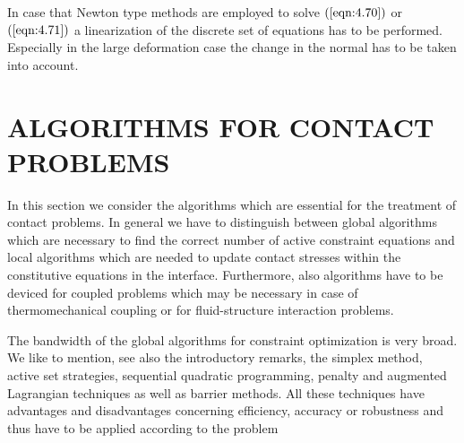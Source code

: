 In case that Newton type methods are employed to solve $ (\ref{eqn:4.70}) $ or $ (\ref{eqn:4.71}) $ a linearization of the discrete set of equations has to be performed. Especially in the large deformation case the change in the normal has to be taken into account. 
\section{ ALGORITHMS FOR CONTACT PROBLEMS}

In this section we consider the algorithms which are essential for the treatment of contact problems. In general we have to distinguish between global algorithms which are necessary to find the correct number of active constraint equations and local algorithms which are needed to update contact stresses within the constitutive equations in the interface. Furthermore, also algorithms have to be deviced for coupled problems which may be necessary in case of thermomechanical coupling or for fluid-structure interaction problems.

The bandwidth of the global algorithms for constraint optimization is very broad. We like to mention, see also the introductory remarks, the simplex method, active set strategies, sequential quadratic programming, penalty and augmented Lagrangian techniques as well as barrier methods. All these techniques have advantages and disadvantages concerning efficiency, accuracy or robustness and thus have to be applied according to the problem